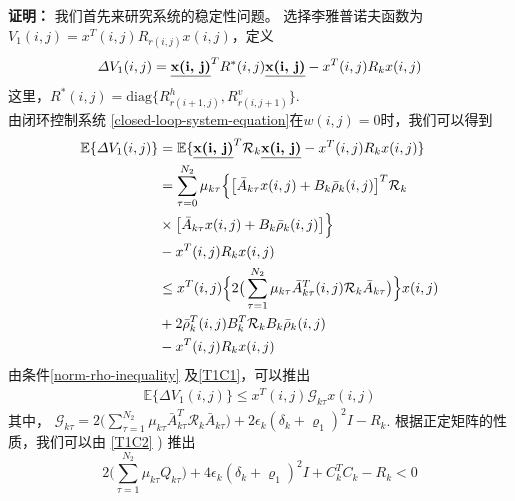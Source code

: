 	{\bf 证明：} 
	我们首先来研究系统的稳定性问题。 选择李雅普诺夫函数为 $V_{1}(i,j) = x^{T}(i,j)R_{r(i,j)}x(i,j)$，定义
	\begin{equation}\label{VAR-DELTA-V1}
	\begin{split}
	\varDelta V_{1}(i,j) = \emph{\textbf{x(i, j)}}^{T} R^{*}(i,j) \emph{\textbf{x(i, j)}} - x^{T}(i,j)R_{k}x(i,j)
	\end{split}
	\end{equation}
	这里，$R^{*}(i,j)=\mathrm{diag}\{R^{h}_{r(i+1,j)},R^{v}_{r(i,j+1)}\}$.\\
	由闭环控制系统 \eqref{closed-loop-system-equation}在$w(i,j)=0$时，我们可以得到 
	\begin{equation}
	\begin{split}
	\mathbb{E}\{\varDelta V_{1}(i,j) \}&=\mathbb{E}\{\emph{\textbf{x(i, j)}}^{T}\mathcal{R}_{k}\emph{\textbf{x(i, j)}} - x^{T}(i,j)R_{k}x(i,j) \} \\
	&=  \sum_{\tau =0}^{N_{2}}\mu_{k\tau }\Big\{\big[\bar{A}_{k\tau }x(i,j)+B_{k}\bar{\rho}_{k}(i,j)\big]^{T}\mathcal{R}_{k}\\
	&\times\big[\bar{A}_{k\tau }x(i,j)+B_{k}\bar{\rho}_{k}(i,j)\big]\Big\}\\
	&- x^{T}(i,j)R_{k}x(i,j) \\
	&\leq x^{T}(i,j) \Big\{2\big(\sum_{\tau =1}^{N_{2}}\mu_{k\tau }\bar{A}^{T}_{k\tau }(i,j)\mathcal{R}_{k}\bar{A}_{k\tau }\big)\Big\}x(i,j)\\ &+2\bar{\rho}^{T}_{k}(i,j)B^{T}_{k}\mathcal{R}_{k}B_{k}\bar{\rho}_{k}(i,j) \\
	&-  x^{T}(i,j)R_{k}x(i,j)
	\end{split}
	\end{equation}
	由条件\eqref{norm-rho-inequality} 及\eqref{T1C1}，可以推出
	\begin{equation}\label{combine-one-1}
	\begin{split}
	\mathbb{E}\{\varDelta  V_{1}(i,j) \} \leq x^{T}(i,j)\mathcal{G}_{k\tau }x(i,j)
	\end{split}
	\end{equation}
	其中， $\mathcal{G}_{k\tau }= 2\big(\sum_{\tau =1}^{N_{2}}\mu_{k\tau }\bar{A}^{T}_{k\tau }\mathcal{R}_{k}\bar{A}_{k\tau }\big)
	+ 2\epsilon_{k}(\delta_{k}+\varrho_{1})^{2}I- R_{k}$.
	根据正定矩阵的性质，我们可以由 \eqref{T1C2} ) 推出
	\begin{equation}
	2\big(\sum_{\tau =1}^{N_{2}}\mu_{k\tau }Q_{k\tau }\big)+4\epsilon_{k}(\delta_{k}+\varrho_{1})^{2}I+C^{T}_{k}C_{k}-R_{k} < 0
	\end{equation}

